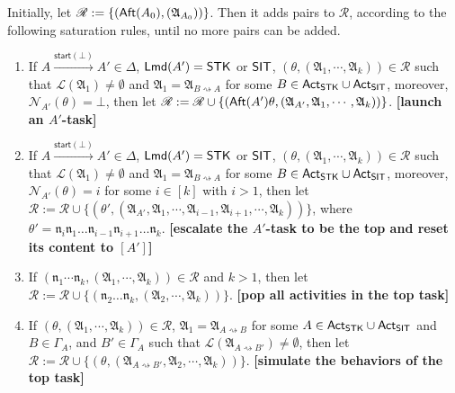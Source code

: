 \documentclass[preprint,12pt]{elsarticle}
\newcommand\act{{\sf Act}}
\newcommand\aft{{\sf Aft}}
\newcommand\lmd{{\sf Lmd}}
\newcommand\singletask{{\sf STK}}
\newcommand\singleinstance{{\sf SIT}}
\newcommand\startactivity{{\mathsf{start} }}
\newcommand\post{{\mathsf{post} }}
\newcommand\namefun{\mathcal{N}}
\newcommand\aname{\mathfrak{n}}
\newcommand\AutReach{\mathscr{R}}
\newcommand{\STK}{\mathsf{STK}}
\newcommand{\SIT}{\mathsf{SIT}}
\newcommand\Aut{{\mathfrak{A} }}
\newcommand\Lang{{\mathscr{L} }}
\newcommand\ConfSet{{\mathscr{C} }}
\begin{document}
Initially, let $\AutReach := \{(\aft(A_0),(\Aut_{A_0}))\}$.
Then it adds pairs to $\AutReach$, according to the following saturation rules, until no more pairs can be added. 
 
\fbox
{
\begin{minipage}{0.9\textwidth}
\begin{enumerate}
    \item If $A \xrightarrow{\startactivity(\bot)}A' \in\Delta$, $\lmd(A')=\STK$ or $\singleinstance$, $(\theta, (\Aut_1,\cdots,\Aut_k)) \in \AutReach$ such that $\Lang(\Aut_1) \neq \emptyset$ and $\Aut_1 = \Aut_{B\rightsquigarrow A}$ for some $B \in \act_\singletask\cup\act_\singleinstance$, moreover, $\namefun_{A'}(\theta) = \bot$,
    then let $\AutReach: = \AutReach \cup \{(\aft(A')\theta, (\Aut_{A'},\Aut_1,\cdots,\Aut_k))\}$.
        \textbf{[launch an $A'$-task]}

    \item If $A \xrightarrow{\startactivity(\bot)}A' \in\Delta$, $\lmd(A')=\STK$ or $\singleinstance$, $(\theta, (\Aut_1,\cdots,\Aut_k)) \in \AutReach$ such that $\Lang(\Aut_1) \neq \emptyset$ and $\Aut_1 = \Aut_{B\rightsquigarrow A}$ for some $B \in \act_\singletask\cup\act_\singleinstance$, moreover, $\namefun_{A'}(\theta) = i$ for some $i \in [k]$ with $i > 1$, 
        then let $\AutReach:= \AutReach \cup \{(\theta', (\Aut_{A'}, \Aut_1, \cdots,\Aut_{i-1},\Aut_{i+1},\cdots,\Aut_{k}))\}$, where $\theta' = \aname_i\aname_1\dots\aname_{i-1}\aname_{i+1}\dots\aname_k$. 
        \textbf{[escalate the $A'$-task to be the top and reset its content to $[A']$]}
    \item If $(\aname_1 \cdots \aname_k, (\Aut_1,\cdots,\Aut_k)) \in \AutReach$ and $k>1$, then let $\AutReach := \AutReach \cup \{(\aname_2\dots\aname_k, (\Aut_2,\cdots,\Aut_k))\}$.
        \textbf{[pop all activities in the top task]}
%
    \item If $(\theta, (\Aut_1,\cdots,\Aut_k)) \in \AutReach$, $\Aut_1 = \Aut_{A\rightsquigarrow B}$ for some $A\in\act_{\STK}\cup\act_{\SIT}$ and $B \in \Gamma_A$, and $B'  \in \Gamma_A$ such that $\Lang(\Aut_{A\rightsquigarrow B'}) \neq \emptyset$, then let 
    $\AutReach := \AutReach \cup \{(\theta, (\Aut_{A\rightsquigarrow B'}, \Aut_2,\cdots,\Aut_k))\}$. 
        \textbf{[simulate the behaviors of the top task]}
\end{enumerate}
\end{minipage}
}
 
\end{document}
